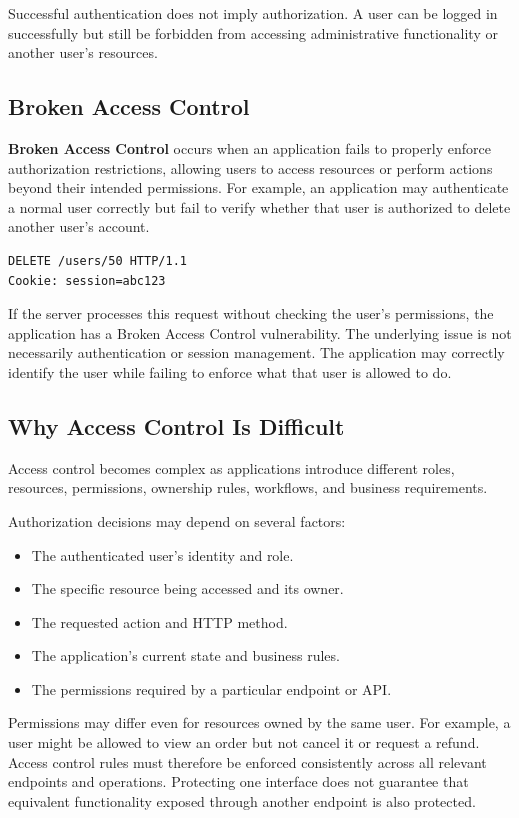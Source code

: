 \documentclass[11pt,a4paper]{article}
\begin{document}
Successful authentication does not imply authorization. A user can be logged in successfully but still be forbidden from accessing administrative functionality or another user's resources.

\subsection{Broken Access Control}

\textbf{Broken Access Control} occurs when an application fails to properly enforce authorization restrictions, allowing users to access resources or perform actions beyond their intended permissions.
For example, an application may authenticate a normal user correctly but fail to verify whether that user is authorized to delete another user's account.

\begin{lstlisting}[language=HTTP]
DELETE /users/50 HTTP/1.1
Cookie: session=abc123
\end{lstlisting}

If the server processes this request without checking the user's permissions, the application has a Broken Access Control vulnerability.
The underlying issue is not necessarily authentication or session management. The application may correctly identify the user while failing to enforce what that user is allowed to do.

\subsection{Why Access Control Is Difficult}

Access control becomes complex as applications introduce different roles, resources, permissions, ownership rules, workflows, and business requirements.

Authorization decisions may depend on several factors:
\begin{itemize}
    \item The authenticated user's identity and role.
    \item The specific resource being accessed and its owner.
    \item The requested action and HTTP method.
    \item The application's current state and business rules.
    \item The permissions required by a particular endpoint or API.
\end{itemize}

Permissions may differ even for resources owned by the same user. For example, a user might be allowed to view an order but not cancel it or request a refund.
Access control rules must therefore be enforced consistently across all relevant endpoints and operations. Protecting one interface does not guarantee that equivalent functionality exposed through another endpoint is also protected.
\end{document}
